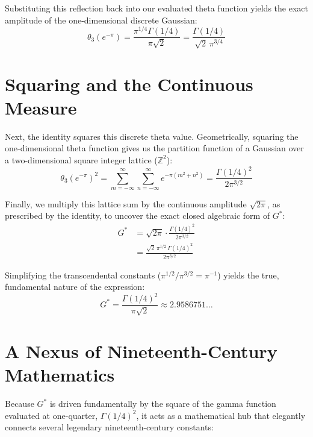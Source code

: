 \documentclass[11pt]{article}
\begin{document}
Substituting this reflection back into our evaluated theta function yields the exact amplitude of the one-dimensional discrete Gaussian:
\begin{equation}
    \theta_3(e^{-\pi}) = \frac{\pi^{1/4} \Gamma(1/4)}{\pi\sqrt{2}} = \frac{\Gamma(1/4)}{\sqrt{2}\,\pi^{3/4}}
\end{equation}

\section{Squaring and the Continuous Measure}
Next, the identity squares this discrete theta value. Geometrically, squaring the one-dimensional theta function gives us the partition function of a Gaussian over a two-dimensional square integer lattice ($\mathbb{Z}^2$):
\begin{equation}
    \theta_3(e^{-\pi})^2 = \sum_{m=-\infty}^\infty \sum_{n=-\infty}^\infty e^{-\pi(m^2+n^2)} = \frac{\Gamma(1/4)^2}{2\pi^{3/2}}
\end{equation}

Finally, we multiply this lattice sum by the continuous amplitude $\sqrt{2\pi}$, as prescribed by the identity, to uncover the exact closed algebraic form of $G^*$:
\begin{align}
    G^* &= \sqrt{2\pi} \cdot \frac{\Gamma(1/4)^2}{2\pi^{3/2}} \nonumber \\[0.2cm]
        &= \frac{\sqrt{2}\,\pi^{1/2}\,\Gamma(1/4)^2}{2\pi^{3/2}}
\end{align}

Simplifying the transcendental constants ($\pi^{1/2} / \pi^{3/2} = \pi^{-1}$) yields the true, fundamental nature of the expression:
\begin{equation}
    \boxed{ G^* = \frac{\Gamma(1/4)^2}{\pi\sqrt{2}} \approx 2.9586751\dots }
\end{equation}

\section{A Nexus of Nineteenth-Century Mathematics}
Because $G^*$ is driven fundamentally by the square of the gamma function evaluated at one-quarter, $\Gamma(1/4)^2$, it acts as a mathematical hub that elegantly connects several legendary nineteenth-century constants:
\end{document}
